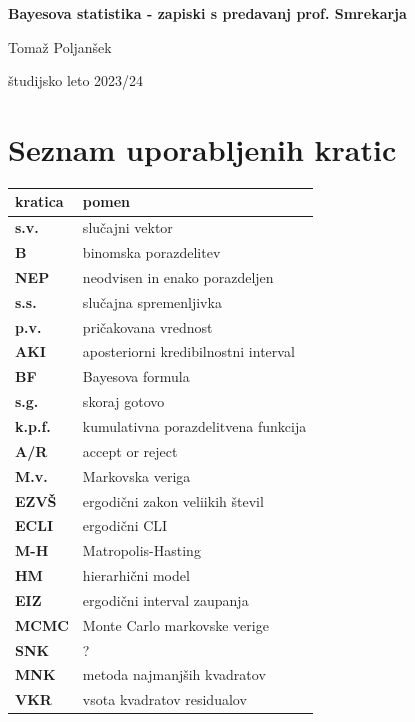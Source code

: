 \documentclass[a4paper, 12pt]{book}
\title{\ttitle}
\author{\tauthor}
\date{\tdate}
\newcommand{\ttitle}{Bayesova statistika - zapiski s predavanj prof. Smrekarja}
\newcommand{\tauthor}{Tomaž Poljanšek}
\newcommand{\tdate}{študijsko leto 2023/24}
\theoremstyle{definition}
\theoremstyle{remark}
\newcommand\mymaketitle{
  \begin{titlepage}
    \begin{center}
        \vspace*{4cm}
        \Huge
        \textbf{\ttitle}
                        
        \vspace{1.5cm}
        \huge
        \tauthor
            
        \vspace{3cm}
        \Large
        \tdate
    \end{center}
  \end{titlepage}
}
\begin{document}
\renewcommand{\thepage}{}
\newcommand{\sn}[1]{"`#1"'}

\mymaketitle

\clearpage
\frontmatter

\pagestyle{empty}
\def\thepage{}
\tableofcontents{}

\def\x{\hspace{3ex}}    %
\def\y{\hspace{2.45ex}}  %
\def\z{\hspace{1.9ex}}    %
\stackMath

\clearpage
{}

\section*{Seznam uporabljenih kratic}

\noindent\begin{tabular}{p{}|p{}}
  {\bf kratica} & {pomen} \\
  \hline
  {\bf s.v.} & {slučajni vektor} \\
  {\bf B} & {binomska porazdelitev} \\
  {\bf NEP} & {neodvisen in enako porazdeljen} \\
  {\bf s.s.} & {slučajna spremenljivka} \\
  {\bf p.v.} & {pričakovana vrednost} \\
  {\bf AKI} & {aposteriorni kredibilnostni interval} \\
  {\bf BF} & {Bayesova formula} \\
  {\bf s.g.} & {skoraj gotovo} \\
  {\bf k.p.f.} & {kumulativna porazdelitvena funkcija} \\
  {\bf A/R} & {accept or reject} \\
  {\bf M.v.} & {Markovska veriga} \\
  {\bf EZVŠ} & {ergodični zakon veliikih števil} \\
  {\bf ECLI} & {ergodični CLI} \\
  {\bf M-H} & {Matropolis-Hasting} \\
  {\bf HM} & {hierarhični model} \\
  {\bf EIZ} & {ergodični interval zaupanja} \\
  {\bf MCMC} & {Monte Carlo markovske verige} \\
  {\bf SNK} & {?} \\
  {\bf MNK} & {metoda najmanjših kvadratov} \\
  {\bf VKR} & {vsota kvadratov residualov}
\end{tabular}
\end{document}
